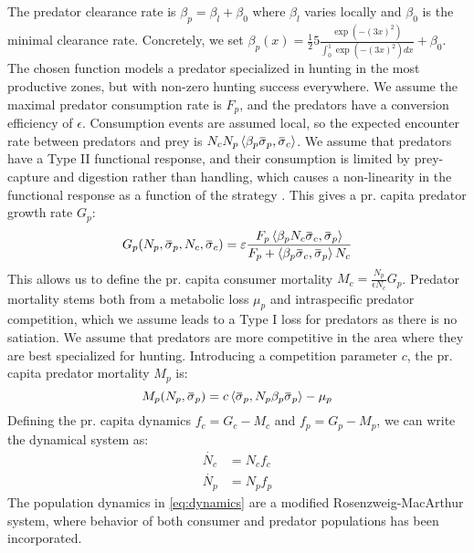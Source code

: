 The predator clearance rate is $\beta_p = \beta_{l} + \beta_0$ where $\beta_l$ varies locally and $\beta_0$ is the minimal clearance rate. Concretely, we set $\beta_p(x) = \frac{1}{2}5 \frac{\exp(-(3 x)^2)}{\int_0^1 \exp(-(3 x)^2) dx} + \beta_0$. The chosen function models a predator specialized in hunting in the most productive zones, but with non-zero hunting success everywhere. We assume the maximal predator consumption rate is $F_p$, and the predators have a conversion efficiency of $\epsilon$. Consumption events are assumed local, so the expected encounter rate between predators and prey is $N_c N_p \ip{\beta_p \overbar{\sigma}_p}{\overbar{\sigma}_c}$. We assume that predators have a Type II functional response, and their consumption is limited by prey-capture and digestion rather than handling, which causes a non-linearity in the functional response as a function of the strategy \citep{Kioerboe2018}. This gives a pr. capita predator growth rate $G_p$:
\begin{equation}
  G_p(N_p, \overbar{\sigma}_p, N_c, \overbar{\sigma}_c )= \epsilon\frac{F_p \ip{\beta_p N_c\overbar{\sigma}_c}{\overbar{\sigma}_p} }{F_p + \ip{\beta_p \overbar{\sigma}_c}{\overbar{\sigma}_p} N_c}
\end{equation}
This allows us to define the pr. capita consumer mortality $M_c = \frac{N_p}{\epsilon N_c}G_p$. Predator mortality stems both from a metabolic loss $\mu_p$ and intraspecific predator competition, which we assume leads to a Type I loss for predators as there is no satiation. We assume that predators are more competitive in the area where they are best specialized for hunting. Introducing a competition parameter $c$, the pr. capita predator mortality $M_p$ is:
\begin{equation}
  M_p(N_p, \overbar{\sigma}_p) =  c \ip{\overbar{\sigma}_p}{N_p\beta_p \overbar{\sigma}_p}  - \mu_p
\end{equation}
Defining the pr. capita dynamics $f_c = G_c - M_c$ and $f_p = G_p - M_p$, we can write the dynamical system as:
\begin{equation}
  \label{eq:dynamics}
  \begin{split}
    \dot{N_c} &= N_c f_c \\
    \dot{N_p} &= N_p f_p
  \end{split}
\end{equation}
The population dynamics in \cref{eq:dynamics} are a modified Rosenzweig-MacArthur system, where behavior of both consumer and predator populations has been incorporated.
